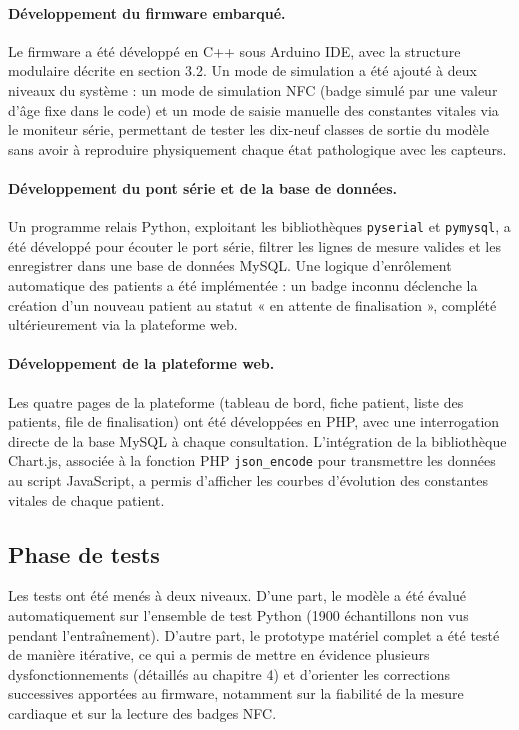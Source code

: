 \documentclass[12pt,a4paper]{report}
\begin{document}
\paragraph{Développement du firmware embarqué.} Le firmware a été développé en C++ sous Arduino IDE, avec la structure modulaire décrite en section 3.2. Un mode de simulation a été ajouté à deux niveaux du système : un mode de simulation NFC (badge simulé par une valeur d'âge fixe dans le code) et un mode de saisie manuelle des constantes vitales via le moniteur série, permettant de tester les dix-neuf classes de sortie du modèle sans avoir à reproduire physiquement chaque état pathologique avec les capteurs.

\paragraph{Développement du pont série et de la base de données.} Un programme relais Python, exploitant les bibliothèques \texttt{pyserial} et \texttt{pymysql}, a été développé pour écouter le port série, filtrer les lignes de mesure valides et les enregistrer dans une base de données MySQL. Une logique d'enrôlement automatique des patients a été implémentée : un badge inconnu déclenche la création d'un nouveau patient au statut « en attente de finalisation », complété ultérieurement via la plateforme web.

\paragraph{Développement de la plateforme web.} Les quatre pages de la plateforme (tableau de bord, fiche patient, liste des patients, file de finalisation) ont été développées en PHP, avec une interrogation directe de la base MySQL à chaque consultation. L'intégration de la bibliothèque Chart.js, associée à la fonction PHP \texttt{json\_encode} pour transmettre les données au script JavaScript, a permis d'afficher les courbes d'évolution des constantes vitales de chaque patient.

\subsection*{Phase de tests}
Les tests ont été menés à deux niveaux. D'une part, le modèle a été évalué automatiquement sur l'ensemble de test Python (1900 échantillons non vus pendant l'entraînement). D'autre part, le prototype matériel complet a été testé de manière itérative, ce qui a permis de mettre en évidence plusieurs dysfonctionnements (détaillés au chapitre 4) et d'orienter les corrections successives apportées au firmware, notamment sur la fiabilité de la mesure cardiaque et sur la lecture des badges NFC.
\end{document}

